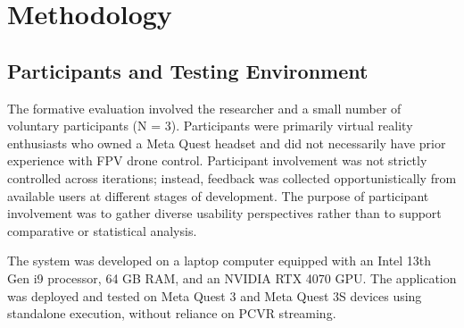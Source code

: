 \newpage
\section{Methodology}














\subsection{Participants and Testing Environment}

The formative evaluation involved the researcher and a small number of voluntary participants (N = 3). Participants were primarily virtual reality enthusiasts who owned a Meta Quest headset and did not necessarily have prior experience with FPV drone control. Participant involvement was not strictly controlled across iterations; instead, feedback was collected opportunistically from available users at different stages of development. The purpose of participant involvement was to gather diverse usability perspectives rather than to support comparative or statistical analysis.

The system was developed on a laptop computer equipped with an Intel 13th Gen i9 processor, 64 GB RAM, and an NVIDIA RTX 4070 GPU. The application was deployed and tested on Meta Quest 3 and Meta Quest 3S devices using standalone execution, without reliance on PCVR streaming.

